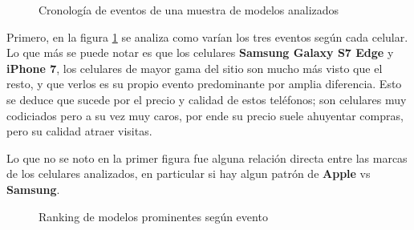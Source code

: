 \documentclass[a4paper]{article}
\begin{document}
\begin{figure}[h!]
	\caption{Cronología de eventos de una muestra de modelos analizados}
	\label{fig:prominentes}
\end{figure}

Primero, en la figura \ref{fig:prominentes} se analiza como varían los tres eventos según cada celular. Lo que más se puede notar es que los celulares \textbf{Samsung Galaxy S7 Edge} y \textbf{iPhone 7}, los celulares de mayor gama del sitio son mucho más visto que el resto, y que verlos es su propio evento predominante por amplia diferencia. Esto se deduce que sucede por el precio y calidad de estos teléfonos; son celulares muy codiciados pero a su vez muy caros, por ende su precio suele ahuyentar compras, pero su calidad atraer visitas.

Lo que no se noto en la primer figura fue alguna relación directa entre las marcas de los celulares analizados, en particular si hay algun patrón de \textbf{Apple} vs \textbf{Samsung}.

\begin{figure}[h!]
	\caption{Ranking de modelos prominentes según evento}
	\label{fig:prominentesrank}
\end{figure}
\end{document}
